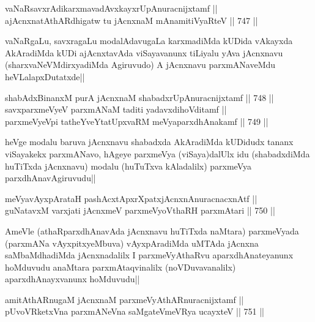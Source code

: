 
\begin{shl}
vaNaRsavxrAdikarxmavadAvxkayxrUpAnuracnijxtamf || \\
ajAcnxnatAthARdhigatw tu jAcnxnaM mAnamitiVyaRteV ||  747 ||  
\end{shl}

\begin{artha} 
vaNaRgaLu, savxragaLu modalAdavugaLa karxmadiMda kUDida vAkayxda 
AkAradiMda kUDi ajAcnxtavAda viSayavanunx tiLiyalu yAva jAcnxnavu 
(sharxvaNeVMdirxyadiMda Agiruvudo) A jAcnxnavu parxmANaveMdu 
heVLalapxDutatxde||
\end{artha}


\begin{shl}
shabAdxBinanxM purA jAcnxnaM shabadxrUpAnuracnijxtamf ||  748 ||  \\
savxparxmeVyeV parxmANaM taditi yadavxdihoVditamf || \\
parxmeVyeV\s pi tatheYveYtatUpxvaRM meVyaparxdhAnakamf ||  749 ||  
\end{shl}	

\begin{artha} 
heVge modalu baruva jAcnxnavu shabadxda AkAradiMda kUDidudx tananx 
viSayakekx parxmANavo, hAgeye parxmeVya (viSaya)dalUlx idu 
(shabadxdiMda huTiTxda jAcnxnavu) modalu (huTuTxva kAladalilx) 
parxmeVya parxdhAnavAgiruvudu||
\end{artha}

\begin{shl}
meVyavAyxpArataH pashAcxtApxrXpatxjAcnxnAnuracnacxnAtf || \\
guNatavxM varxjati jAcnxmeV parxmeVyoV\s thaRH parxmAtari ||  750 ||  
\end{shl}

\begin{artha} 
AmeVle (athaRparxdhAnavAda jAcnxnavu huTiTxda naMtara) parxmeVyada 
(parxmANa vAyxpitxyeMbuva) vAyxpAradiMda uMTAda jAcnxna saMbaMdhadiMda 
jAcnxnadalilx I parxmeVyAthaRvu aparxdhAnateyanunx hoMduvudu anaMtara 
parxmAtaqvinalilx (noVDuvavanalilx) aparxdhAnayxvanunx hoMduvudu||
\end{artha}

\begin{shl}
amitAthARnugaM jAcnxnaM parxmeVyAthARnuracnijxtamf || \\
pUvoVRketxVna parxmANeVna saMgateVmeVRya ucayxteV ||  751 ||  
\end{shl}

